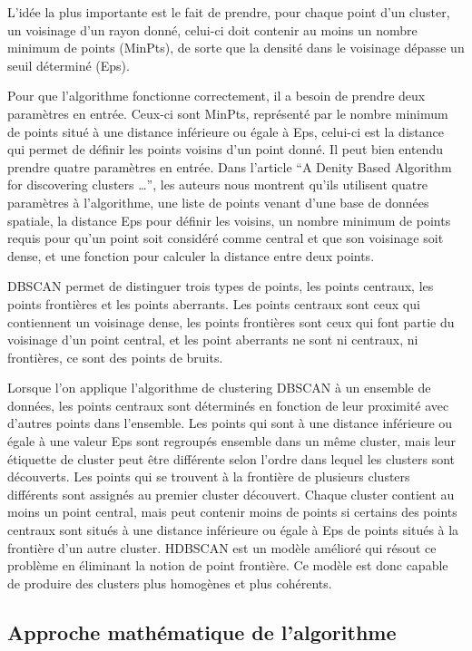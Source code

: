\documentclass[
  oneside]{memoire-umons}
\begin{document}
L'idée la plus importante est le fait de prendre, pour chaque point d'un
cluster, un voisinage d'un rayon donné, celui-ci doit contenir au moins
un nombre minimum de points (MinPts), de sorte que la densité dans le
voisinage dépasse un seuil déterminé (Eps).

Pour que l'algorithme fonctionne correctement, il a besoin de prendre
deux paramètres en entrée. Ceux-ci sont MinPts, représenté par le nombre
minimum de points situé à une distance inférieure ou égale à Eps,
celui-ci est la distance qui permet de définir les points voisins d'un
point donné. Il peut bien entendu prendre quatre paramètres en entrée.
Dans l'article ``A Denity Based Algorithm for discovering clusters
\ldots{}'', les auteurs nous montrent
qu'ils utilisent quatre paramètres à l'algorithme, une liste de points
venant d'une base de données spatiale, la distance Eps pour définir les
voisins, un nombre minimum de points requis pour qu'un point soit
considéré comme central et que son voisinage soit dense, et une fonction
pour calculer la distance entre deux points.

DBSCAN permet de distinguer trois types de points, les points centraux,
les points frontières et les points aberrants. Les points centraux sont
ceux qui contiennent un voisinage dense, les points frontières sont ceux
qui font partie du voisinage d'un point central, et les point aberrants
ne sont ni centraux, ni frontières, ce sont des points de bruits.

Lorsque l'on applique l'algorithme de clustering DBSCAN à un ensemble de
données, les points centraux sont déterminés en fonction de leur
proximité avec d'autres points dans l'ensemble. Les points qui sont à
une distance inférieure ou égale à une valeur Eps sont regroupés
ensemble dans un même cluster, mais leur étiquette de cluster peut être
différente selon l'ordre dans lequel les clusters sont découverts. Les
points qui se trouvent à la frontière de plusieurs clusters différents
sont assignés au premier cluster découvert. Chaque cluster contient au
moins un point central, mais peut contenir moins de points si certains
des points centraux sont situés à une distance inférieure ou égale à Eps
de points situés à la frontière d'un autre cluster.
HDBSCAN est un modèle amélioré qui
résout ce problème en éliminant la notion de point frontière. Ce modèle
est donc capable de produire des clusters plus homogènes et plus
cohérents.

\hypertarget{approche-mathuxe9matique-de-lalgorithme}{%
\subsection{Approche mathématique de
l'algorithme}\label{approche-mathuxe9matique-de-lalgorithme}}
\end{document}
